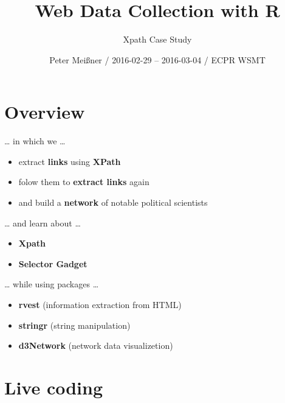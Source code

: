 \documentclass[ignorenonframetext,]{beamer}
\title{Web Data Collection with R}
\subtitle{Xpath Case Study}
\author{Peter Meißner / 2016-02-29 -- 2016-03-04 / ECPR WSMT}
\date{}
\providecommand{\tightlist}{%
  \setlength{\itemsep}{0pt}\setlength{\parskip}{0pt}}
\begin{document}
\frame{\titlepage}

\begin{frame}
\tableofcontents[hideallsubsections]
\end{frame}

\section{Overview}\label{overview}

\begin{frame}{\ldots{} in which we \ldots{}}

\begin{itemize}
\tightlist
\item
  extract \textbf{links} using \textbf{XPath}
\item
  folow them to \textbf{extract links} again
\item
  and build a \textbf{network} of notable political scientists
\end{itemize}

\end{frame}

\begin{frame}{\ldots{} and learn about \ldots{}}

\begin{itemize}
\tightlist
\item
  \textbf{Xpath}
\item
  \textbf{Selector Gadget}
\end{itemize}

\end{frame}

\begin{frame}{\ldots{} while using packages \ldots{}}

\begin{itemize}
\tightlist
\item
  \textbf{rvest} (information extraction from HTML)
\item
  \textbf{stringr} (string manipulation)
\item
  \textbf{d3Network} (network data visualizetion)
\end{itemize}

\end{frame}

\section{Live coding}\label{live-coding}
\end{document}
